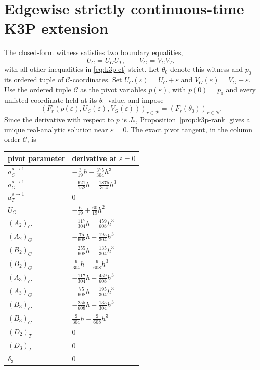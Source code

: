 \documentclass[11pt]{article}
\theoremstyle{remark}\newtheorem{remark}[theorem]{Remark}
\begin{document}
\section{Edgewise strictly continuous-time K3P extension}\label{sec:k3p-ct}
The closed-form witness satisfies two boundary equalities,
\[
U_C=U_GU_T,\qquad V_G=V_CV_T,
\]
with all other inequalities in \eqref{eq:k3p-ct} strict. Let $\theta_0$ denote this witness and $p_0$ its ordered tuple of $\mathcal C$-coordinates. Set $U_C(\varepsilon)=U_C+\varepsilon$ and $V_G(\varepsilon)=V_G+\varepsilon$. Use the ordered tuple $\mathcal C$ as the pivot variables $p(\varepsilon)$, with $p(0)=p_0$ and every unlisted coordinate held at its $\theta_0$ value, and impose
\[
(F_r(p(\varepsilon),U_C(\varepsilon),V_G(\varepsilon)))_{r\in\mathcal R}
=(F_r(\theta_0))_{r\in\mathcal R}.
\]
Since the derivative with respect to $p$ is $J_*$, Proposition~\ref{prop:k3p-rank} gives a unique real-analytic solution near $\varepsilon=0$. The exact pivot tangent, in the column order $\mathcal C$, is
\begin{center}
\small
\begin{tabular}{@{}ll@{}}
\toprule
pivot parameter & derivative at $\varepsilon=0$\\
\midrule
$a_C^{\rho\to1}$ & $-\frac3{19}h-\frac{375}{304}h^3$\\
$a_G^{\rho\to1}$ & $-\frac{621}{152}h+\frac{1875}{304}h^3$\\
$a_T^{\rho\to1}$ & $0$\\
$U_G$ & $-\frac6{19}+\frac{60}{19}h^2$\\
$(A_2)_C$ & $-\frac{117}{304}h+\frac{459}{608}h^3$\\
$(A_2)_G$ & $-\frac{75}{608}h-\frac{195}{304}h^3$\\
$(B_2)_C$ & $-\frac{255}{608}h+\frac{135}{304}h^3$\\
$(B_2)_G$ & $\frac9{304}h-\frac9{608}h^3$\\
$(A_3)_C$ & $-\frac{117}{304}h+\frac{459}{608}h^3$\\
$(A_3)_G$ & $-\frac{75}{608}h-\frac{195}{304}h^3$\\
$(B_3)_C$ & $-\frac{255}{608}h+\frac{135}{304}h^3$\\
$(B_3)_G$ & $\frac9{304}h-\frac9{608}h^3$\\
$(D_2)_T$ & $0$\\
$(D_3)_T$ & $0$\\
$\delta_3$ & $0$\\
\bottomrule
\end{tabular}
\end{center}
\end{document}
